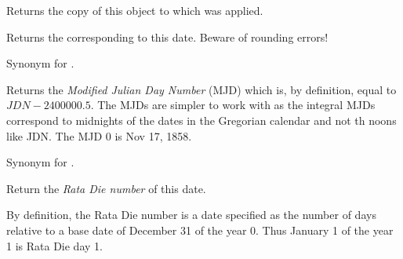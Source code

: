 Returns the copy of this object to which
 was applied.


\label{wxdatetimegetjuliandaynumber}


Returns the  corresponding to this date. Beware
of rounding errors!



\label{wxdatetimegetjdn}


Synonym for .

\label{wxdatetimegetmodifiedjuliandaynumber}


Returns the {\it Modified Julian Day Number} (MJD) which is, by definition,
equal to $JDN - 2400000.5$. The MJDs are simpler to work with as the integral
MJDs correspond to midnights of the dates in the Gregorian calendar and not th
noons like JDN. The MJD $0$ is Nov 17, 1858.

\label{wxdatetimegetmjd}


Synonym for .

\label{wxdatetimegetratadie}


Return the {\it Rata Die number} of this date.

By definition, the Rata Die number is a date specified as the number of days
relative to a base date of December 31 of the year 0. Thus January 1 of the
year 1 is Rata Die day 1.


\label{wxdatetimetotimezone}

